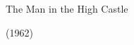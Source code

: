 \documentclass{beamer}
\begin{document}
  \begin{frame}[plain]
  \end{frame}
  \begin{frame}[c]
  	\centering
  	\Huge
  	The Man in the High Castle
  	
  	(1962)
  \end{frame}

\begin{frame}[plain]
\end{frame}
\end{document}
